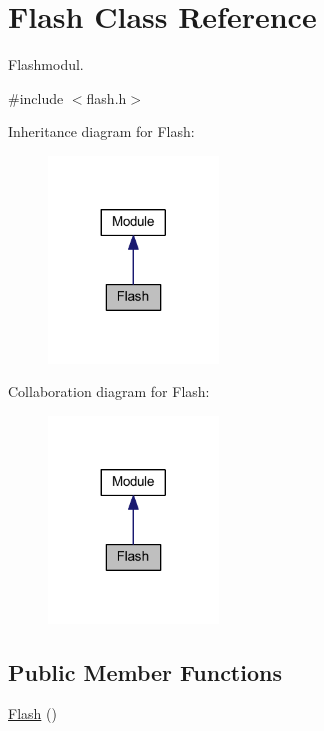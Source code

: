 \hypertarget{class_flash}{}\section{Flash Class Reference}
\label{class_flash}


Flashmodul.  




{\ttfamily \#include $<$flash.\+h$>$}



Inheritance diagram for Flash\+:\nopagebreak
\begin{figure}[H]
\begin{center}
\leavevmode
\includegraphics[width=128pt]{class_flash__inherit__graph}
\end{center}
\end{figure}


Collaboration diagram for Flash\+:\nopagebreak
\begin{figure}[H]
\begin{center}
\leavevmode
\includegraphics[width=128pt]{class_flash__coll__graph}
\end{center}
\end{figure}
\subsection*{Public Member Functions}
\begin{DoxyCompactItemize}
\item 
\mbox{\hyperlink{class_flash_a67aac213fb3576b2a3ae1d5862f99812}{Flash}} ()
\end{DoxyCompactItemize}


